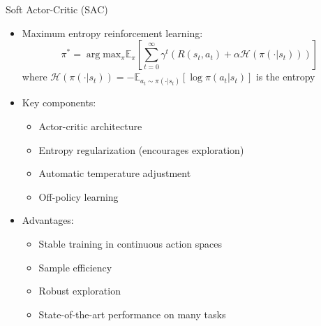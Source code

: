 \documentclass[10pt]{beamer}
\renewcommand{\max}{\text{max}}
\begin{document}
\begin{frame}{Soft Actor-Critic (SAC)}
    \begin{itemize}
        \item Maximum entropy reinforcement learning:
        \begin{equation}
            \pi^* = \arg\max_\pi \mathbb{E}_{\pi}\left[\sum_{t=0}^{\infty} \gamma^t \left(R(s_t, a_t) + \alpha \mathcal{H}(\pi(\cdot|s_t))\right)\right]
        \end{equation}
        where $\mathcal{H}(\pi(\cdot|s_t)) = -\mathbb{E}_{a_t \sim \pi(\cdot|s_t)}[\log \pi(a_t|s_t)]$ is the entropy
        
        \item Key components:
        \begin{itemize}
            \item Actor-critic architecture
            \item Entropy regularization (encourages exploration)
            \item Automatic temperature adjustment
            \item Off-policy learning
        \end{itemize}
        \vspace{0.2cm}
        \item Advantages:
        \begin{itemize}
            \item Stable training in continuous action spaces
            \item Sample efficiency
            \item Robust exploration
            \item State-of-the-art performance on many tasks
        \end{itemize}
    \end{itemize}
\end{frame}

\end{document}
